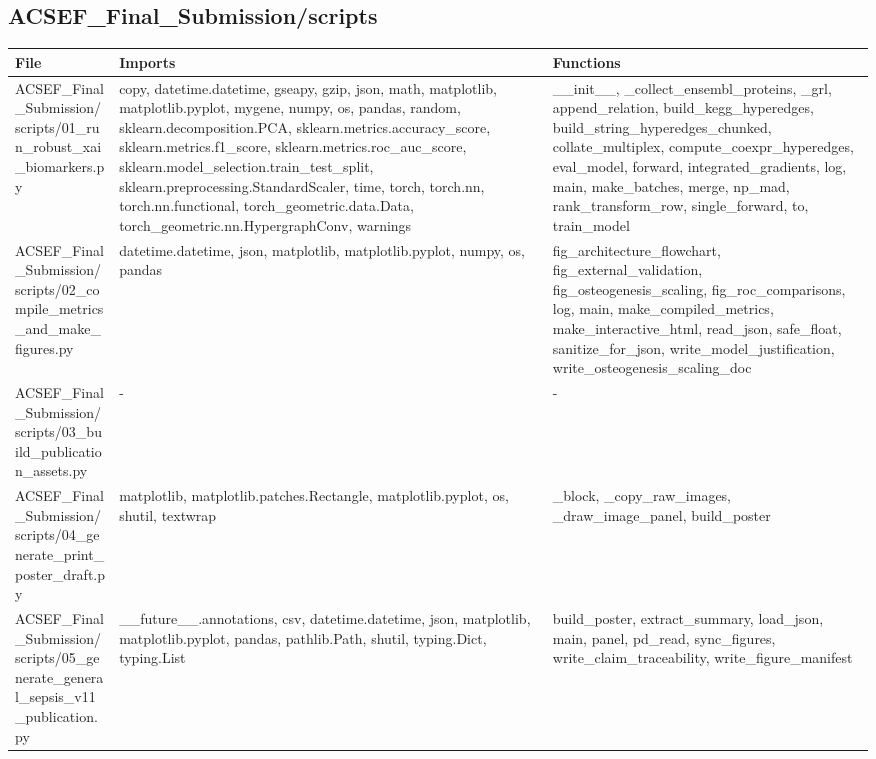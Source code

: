 \documentclass[11pt]{article}
\begin{document}
\subsection{ACSEF\_Final\_Submission/scripts}
\begin{longtable}{p{}p{}p{}}
\textbf{File} & \textbf{Imports} & \textbf{Functions} \\ \hline
ACSEF\_Final\_Submission/scripts/01\_run\_robust\_xai\_biomarkers.py & copy, datetime.datetime, gseapy, gzip, json, math, matplotlib, matplotlib.pyplot, mygene, numpy, os, pandas, random, sklearn.decomposition.PCA, sklearn.metrics.accuracy\_score, sklearn.metrics.f1\_score, sklearn.metrics.roc\_auc\_score, sklearn.model\_selection.train\_test\_split, sklearn.preprocessing.StandardScaler, time, torch, torch.nn, torch.nn.functional, torch\_geometric.data.Data, torch\_geometric.nn.HypergraphConv, warnings & \_\_init\_\_, \_collect\_ensembl\_proteins, \_grl, append\_relation, build\_kegg\_hyperedges, build\_string\_hyperedges\_chunked, collate\_multiplex, compute\_coexpr\_hyperedges, eval\_model, forward, integrated\_gradients, log, main, make\_batches, merge, np\_mad, rank\_transform\_row, single\_forward, to, train\_model \\
ACSEF\_Final\_Submission/scripts/02\_compile\_metrics\_and\_make\_figures.py & datetime.datetime, json, matplotlib, matplotlib.pyplot, numpy, os, pandas & fig\_architecture\_flowchart, fig\_external\_validation, fig\_osteogenesis\_scaling, fig\_roc\_comparisons, log, main, make\_compiled\_metrics, make\_interactive\_html, read\_json, safe\_float, sanitize\_for\_json, write\_model\_justification, write\_osteogenesis\_scaling\_doc \\
ACSEF\_Final\_Submission/scripts/03\_build\_publication\_assets.py & - & - \\
ACSEF\_Final\_Submission/scripts/04\_generate\_print\_poster\_draft.py & matplotlib, matplotlib.patches.Rectangle, matplotlib.pyplot, os, shutil, textwrap & \_block, \_copy\_raw\_images, \_draw\_image\_panel, build\_poster \\
ACSEF\_Final\_Submission/scripts/05\_generate\_general\_sepsis\_v11\_publication.py & \_\_future\_\_.annotations, csv, datetime.datetime, json, matplotlib, matplotlib.pyplot, pandas, pathlib.Path, shutil, typing.Dict, typing.List & build\_poster, extract\_summary, load\_json, main, panel, pd\_read, sync\_figures, write\_claim\_traceability, write\_figure\_manifest \\
\end{longtable}
\end{document}
